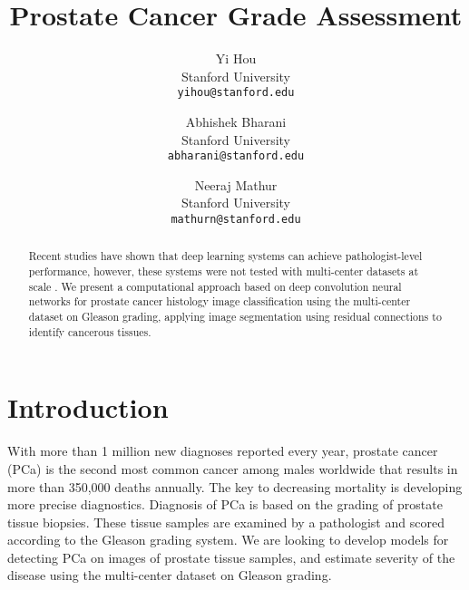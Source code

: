 \documentclass[10pt,twocolumn,letterpaper]{article}
\begin{document}
\title{Prostate Cancer Grade Assessment}

\author{Yi Hou\\
Stanford University\\
{\tt\small yihou@stanford.edu}
\and
Abhishek Bharani\\
Stanford University\\
{\tt\small abharani@stanford.edu}
\and
Neeraj Mathur\\
Stanford University\\
{\tt\small mathurn@stanford.edu}
}
\maketitle

\begin{abstract}
 Recent studies have shown that deep learning systems can achieve pathologist-level performance, however, these systems were not tested with multi-center datasets at scale \cite{Authors01}. We present a computational approach based on deep convolution neural networks for prostate cancer histology image classification using the multi-center dataset on Gleason grading, applying image segmentation using residual connections to identify cancerous tissues.

\end{abstract}

\section{Introduction}

With more than 1 million new diagnoses reported every year, prostate cancer (PCa) is the second most common cancer among males worldwide that results in more than 350,000 deaths annually. The key to decreasing mortality is developing more precise diagnostics. Diagnosis of PCa is based on the grading of prostate tissue biopsies. These tissue samples are examined by a pathologist and scored according to the Gleason grading system. We are looking to develop models for detecting PCa on images of prostate tissue samples, and estimate severity of the disease using the multi-center dataset on Gleason grading.
\end{document}
